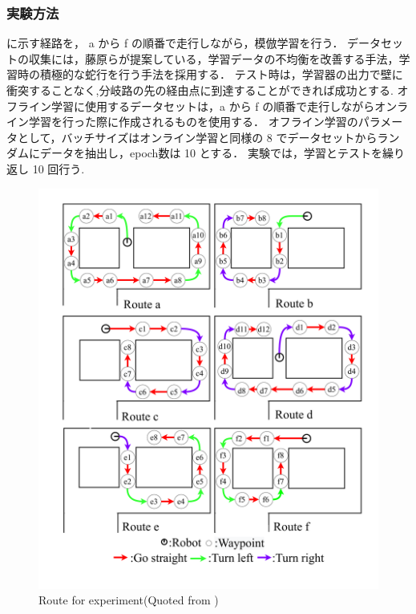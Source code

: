 \clearpage
\subsubsection{実験方法}
に示す経路を， a から f の順番で走行しながら，模倣学習を行う．
データセットの収集には，藤原ら\cite{fujiwara2023}が提案している，学習データの不均衡を改善する手法，学習時の積極的な蛇行を行う手法を採用する．
テスト時は，学習器の出力で壁に衝突することなく,分岐路の先の経由点に到達することができれば成功とする.
オフライン学習に使用するデータセットは，a から f の順番で走行しながらオンライン学習を行った際に作成されるものを使用する．
オフライン学習のパラメータとして，バッチサイズはオンライン学習と同様の 8 でデータセットからランダムにデータを抽出し，epoch数は 10 とする．
実験では，学習とテストを繰り返し 10 回行う.

\begin{figure}
  \centering
  \includegraphics[width=130mm]{images/pdf/fujiwara/route.pdf}
  \caption[Route for experiment]{Route for experiment(Quoted from \cite{fujiwara2023})}
  \label{fig:fujiwara_route}
\end{figure}

\clearpage
